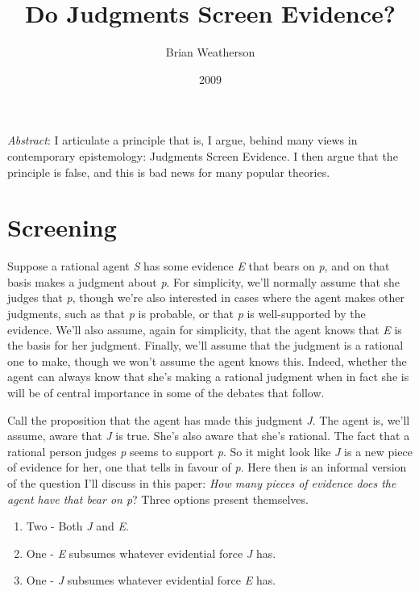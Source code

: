 \documentclass[
  11pt,
  letterpaper,
  DIV=11,
  numbers=noendperiod,
  twoside]{scrartcl}
\title{Do Judgments Screen Evidence?}
\author{Brian Weatherson}
\date{2009}
\providecommand{\tightlist}{%
  \setlength{\itemsep}{0pt}\setlength{\parskip}{0pt}}\usepackage{longtable,booktabs,array}
\renewenvironment{abstract}
 {\vspace{-1.25cm}
 \quotation\small\noindent\emph{Abstract}:}
 {\endquotation}
\begin{document}
\maketitle
\begin{abstract}
I articulate a principle that is, I argue, behind many views in
contemporary epistemology: Judgments Screen Evidence. I then argue that
the principle is false, and this is bad news for many popular theories.
\end{abstract}


\section{Screening}\label{screening}

Suppose a rational agent \emph{S} has some evidence \emph{E} that bears
on \emph{p}, and on that basis makes a judgment about \emph{p}. For
simplicity, we'll normally assume that she judges that \emph{p}, though
we're also interested in cases where the agent makes other judgments,
such as that \emph{p} is probable, or that \emph{p} is well-supported by
the evidence. We'll also assume, again for simplicity, that the agent
knows that \emph{E} is the basis for her judgment. Finally, we'll assume
that the judgment is a rational one to make, though we won't assume the
agent knows this. Indeed, whether the agent can always know that she's
making a rational judgment when in fact she is will be of central
importance in some of the debates that follow.

Call the proposition that the agent has made this judgment \emph{J}. The
agent is, we'll assume, aware that \emph{J} is true. She's also aware
that she's rational. The fact that a rational person judges \emph{p}
seems to support \emph{p}. So it might look like \emph{J} is a new piece
of evidence for her, one that tells in favour of \emph{p}. Here then is
an informal version of the question I'll discuss in this paper:
\emph{How many pieces of evidence does the agent have that bear on p}?
Three options present themselves.

\begin{enumerate}
\def\labelenumi{\arabic{enumi}.}
\tightlist
\item
  Two - Both \emph{J} and \emph{E}.
\item
  One - \emph{E} subsumes whatever evidential force \emph{J} has.
\item
  One - \emph{J} subsumes whatever evidential force \emph{E} has.
\end{enumerate}
\end{document}
